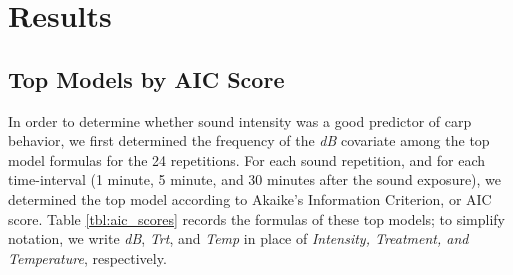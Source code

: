 \documentclass[12pt]{article}
\begin{document}
\section{Results}

	\subsection{Top Models by AIC Score}
	
		In order to determine whether sound intensity was a good predictor of carp behavior, we first determined the frequency of the \emph{dB} covariate among the top model formulas for the 24 repetitions. For each sound repetition, and for each time-interval (1 minute, 5 minute, and 30 minutes after the sound exposure), we determined the top model according to Akaike's Information Criterion, or AIC score. Table \ref{tbl:aic_scores} records the formulas of these top models; to simplify notation, we write \emph{dB}, \emph{Trt}, and \emph{Temp} in place of \emph{Intensity, Treatment, and Temperature}, respectively.
		
\end{document}
